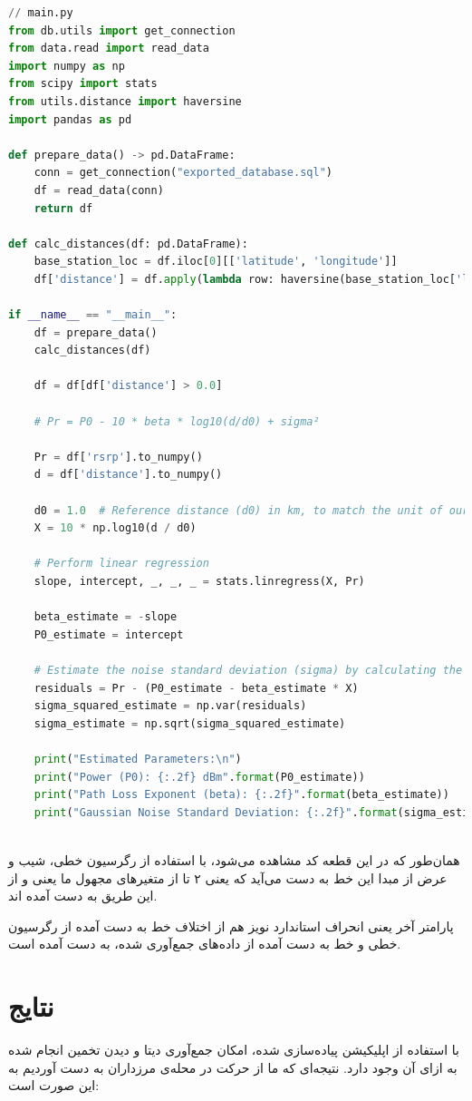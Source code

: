 \begin{lstlisting}[language=Python]
// main.py
from db.utils import get_connection
from data.read import read_data
import numpy as np
from scipy import stats
from utils.distance import haversine
import pandas as pd

def prepare_data() -> pd.DataFrame:
	conn = get_connection("exported_database.sql")
	df = read_data(conn)
	return df

def calc_distances(df: pd.DataFrame):
	base_station_loc = df.iloc[0][['latitude', 'longitude']]
	df['distance'] = df.apply(lambda row: haversine(base_station_loc['latitude'], base_station_loc['longitude'], row['latitude'], row['longitude']), axis=1)

if __name__ == "__main__":
	df = prepare_data()
	calc_distances(df)
	
	df = df[df['distance'] > 0.0]
	
	# Pr = P0 - 10 * beta * log10(d/d0) + sigma²
	
	Pr = df['rsrp'].to_numpy()
	d = df['distance'].to_numpy()
	
	d0 = 1.0  # Reference distance (d0) in km, to match the unit of our calculated distances
	X = 10 * np.log10(d / d0)
	
	# Perform linear regression
	slope, intercept, _, _, _ = stats.linregress(X, Pr)
	
	beta_estimate = -slope
	P0_estimate = intercept
	
	# Estimate the noise standard deviation (sigma) by calculating the residuals
	residuals = Pr - (P0_estimate - beta_estimate * X)
	sigma_squared_estimate = np.var(residuals)
	sigma_estimate = np.sqrt(sigma_squared_estimate)
	
	print("Estimated Parameters:\n")
	print("Power (P0): {:.2f} dBm".format(P0_estimate))
	print("Path Loss Exponent (beta): {:.2f}".format(beta_estimate))
	print("Gaussian Noise Standard Deviation: {:.2f}".format(sigma_estimate))
	
\end{lstlisting}

همان‌طور که در این قطعه کد مشاهده می‌شود، با استفاده از رگرسیون خطی، شیب و عرض از مبدا این خط به دست می‌آید که یعنی ۲ تا از متغیرهای مجهول ما یعنی 
\lr{$\beta$}
و
از این طریق به دست آمده اند. 

پارامتر آخر یعنی انحراف استاندارد نویز هم از اختلاف خط به دست آمده از رگرسیون خطی و خط به دست آمده از داده‌های جمع‌آوری شده، به دست آمده است.

\section{نتایج}

با استفاده از اپلیکیشن پیاده‌سازی شده، امکان جمع‌آوری دیتا و دیدن تخمین انجام شده به ازای آن وجود دارد. نتیجه‌ای که ما از حرکت در محله‌ی مرزداران به دست آوردیم به این صورت است:

